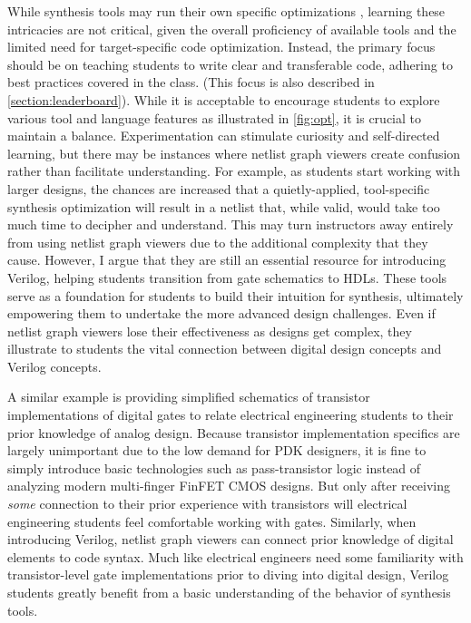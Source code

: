 While synthesis tools may run their own specific optimizations \cite{1364.1-2005}, learning these intricacies are not critical, given the overall proficiency of available tools and the limited need for target-specific code optimization. Instead, the primary focus should be on teaching students to write clear and transferable code, adhering to best practices covered in the class. (This focus is also described in \autoref{section:leaderboard}). While it is acceptable to encourage students to explore various tool and language features as illustrated in \autoref{fig:opt}, it is crucial to maintain a balance. Experimentation can stimulate curiosity and self-directed learning, but there may be instances where netlist graph viewers create confusion rather than facilitate understanding. For example, as students start working with larger designs, the chances are increased that a quietly-applied, tool-specific synthesis optimization will result in a netlist that, while valid, would take too much time to decipher and understand. This may turn instructors away entirely from using netlist graph viewers due to the additional complexity that they cause. However, I argue that they are still an essential resource for introducing Verilog, helping students transition from gate schematics to HDLs. These tools serve as a foundation for students to build their intuition for synthesis, ultimately empowering them to undertake the more advanced design challenges. Even if netlist graph viewers lose their effectiveness as designs get complex, they illustrate to students the vital connection between digital design concepts and Verilog concepts.

A similar example is providing simplified schematics of transistor implementations of digital gates to relate electrical engineering students to their prior knowledge of analog design. Because transistor implementation specifics are largely unimportant due to the low demand for PDK designers, it is fine to simply introduce basic technologies such as pass-transistor logic instead of analyzing modern multi-finger FinFET CMOS designs. But only after receiving \emph{some} connection to their prior experience with transistors will electrical engineering students feel comfortable working with gates. Similarly, when introducing Verilog, netlist graph viewers can connect prior knowledge of digital elements to code syntax. Much like electrical engineers need some familiarity with transistor-level gate implementations prior to diving into digital design, Verilog students greatly benefit from a basic understanding of the behavior of synthesis tools.

